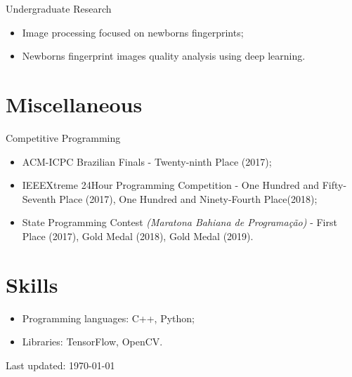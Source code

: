 \documentclass[letterpaper]{article}
\def\footerlink{}
\begin{document}
  Undergraduate Research
  \begin{itemize}
    \item Image processing focused on newborns fingerprints;
    \item Newborns fingerprint images quality analysis using deep learning.
  \end{itemize}


\section*{Miscellaneous}

Competitive Programming

\begin{itemize}
  \item ACM-ICPC Brazilian Finals - Twenty-ninth Place (2017);
  \item IEEEXtreme 24Hour Programming Competition - One Hundred and Fifty-Seventh Place (2017), One Hundred and Ninety-Fourth Place(2018);
  \item State Programming Contest \textit{(Maratona Bahiana de Programação)} - First Place (2017), Gold Medal (2018), Gold Medal (2019).
\end{itemize}

\section*{Skills}
\begin{itemize}
  \item Programming languages: C++, Python;
  \item Libraries: TensorFlow, OpenCV.
\end{itemize}

\bigskip

\begin{center}
  \begin{footnotesize}
    Last updated: \today \\
    \href{\footerlink}{\texttt{\footerlink}}
  \end{footnotesize}
\end{center}
\end{document}
